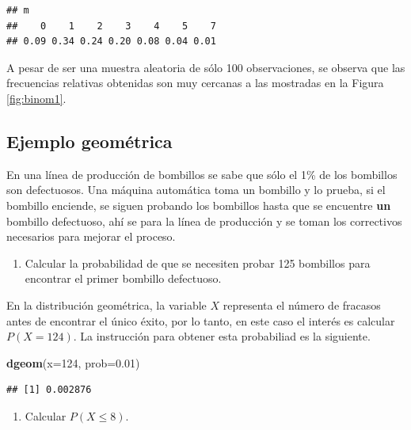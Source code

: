 \documentclass[10pt,]{krantz}
\makeatletter
\newenvironment{Shaded}{\begin{snugshade}}{\end{snugshade}}
\newcommand{\KeywordTok}[1]{\textcolor[rgb]{0.13,0.29,0.53}{\textbf{#1}}}
\newcommand{\DataTypeTok}[1]{\textcolor[rgb]{0.13,0.29,0.53}{#1}}
\newcommand{\DecValTok}[1]{\textcolor[rgb]{0.00,0.00,0.81}{#1}}
\newcommand{\FloatTok}[1]{\textcolor[rgb]{0.00,0.00,0.81}{#1}}
\newcommand{\NormalTok}[1]{#1}
\providecommand{\tightlist}{%
  \setlength{\itemsep}{0pt}\setlength{\parskip}{0pt}}
\newenvironment{kframe}{%
\medskip{}
\setlength{\fboxsep}{.8em}
 \def\at@end@of@kframe{}%
 \ifinner\ifhmode%
  \def\at@end@of@kframe{\end{minipage}}%
  \begin{minipage}{\columnwidth}%
 \fi\fi%
 \def\FrameCommand##1{\hskip\@totalleftmargin \hskip-\fboxsep
 \colorbox{shadecolor}{##1}\hskip-\fboxsep
     \hskip-\linewidth \hskip-\@totalleftmargin \hskip\columnwidth}%
 \MakeFramed {\advance\hsize-\width
   \@totalleftmargin\z@ \linewidth\hsize
   \@setminipage}}%
 {\par\unskip\endMakeFramed%
 \at@end@of@kframe}
\renewenvironment{Shaded}{\begin{kframe}}{\end{kframe}}
\makeatother
\begin{document}
\begin{verbatim}
## m
##    0    1    2    3    4    5    7 
## 0.09 0.34 0.24 0.20 0.08 0.04 0.01
\end{verbatim}

A pesar de ser una muestra aleatoria de sólo 100 observaciones, se
observa que las frecuencias relativas obtenidas son muy cercanas a las
mostradas en la Figura \ref{fig:binom1}.

\subsection*{Ejemplo geométrica}\label{ejemplo-geometrica}


En una línea de producción de bombillos se sabe que sólo el 1\% de los
bombillos son defectuosos. Una máquina automática toma un bombillo y lo
prueba, si el bombillo enciende, se siguen probando los bombillos hasta
que se encuentre \textbf{un} bombillo defectuoso, ahí se para la línea
de producción y se toman los correctivos necesarios para mejorar el
proceso.

\begin{enumerate}
\def\labelenumi{\arabic{enumi})}
\tightlist
\item
  Calcular la probabilidad de que se necesiten probar 125 bombillos para
  encontrar el primer bombillo defectuoso.
\end{enumerate}

En la distribución geométrica, la variable \(X\) representa el número de
fracasos antes de encontrar el único éxito, por lo tanto, en este caso
el interés es calcular \(P(X=124)\). La instrucción para obtener esta
probabiliad es la siguiente.

\begin{Shaded}
\begin{Highlighting}[]
\KeywordTok{dgeom}\NormalTok{(}\DataTypeTok{x=}\DecValTok{124}\NormalTok{, }\DataTypeTok{prob=}\FloatTok{0.01}\NormalTok{)}
\end{Highlighting}
\end{Shaded}

\begin{verbatim}
## [1] 0.002876
\end{verbatim}

\begin{enumerate}
\def\labelenumi{\arabic{enumi})}
\setcounter{enumi}{1}
\tightlist
\item
  Calcular \(P(X \leq 8)\).
\end{enumerate}
\end{document}

